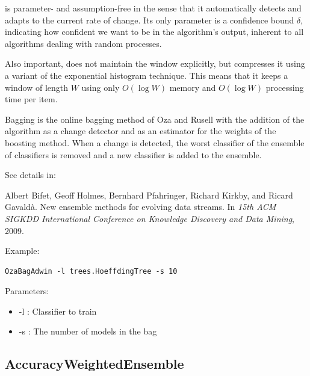 \documentclass[a4paper,12pt,twoside]{book}
\begin{document}

\adwin is parameter- and assumption-free in the sense that 
it automatically detects and adapts to the current rate of change. 
Its only parameter is a confidence bound $\delta$,
indicating how confident we want to be in the algorithm's output, 
inherent to all algorithms dealing with random processes. 

Also important, \adwin does not maintain the window
explicitly, but compresses it using a variant of the exponential histogram
technique. %
This means that it keeps a window of length $W$
using only $O(\log W)$ memory and $O(\log W)$ processing time per item. %

\adwin Bagging is the online bagging method of Oza and Rusell %
with the  addition of the \adwin algorithm as a change 
detector and as an estimator for the weights of the boosting method.
When a change is detected, the worst classifier of the ensemble of classifiers 
is removed and a new classifier is added to the ensemble.


See details in:

\begin{itemize}
Albert Bifet, Geoff Holmes, Bernhard Pfahringer, Richard Kirkby, and Ricard
  Gavald\`a.
\newblock New ensemble methods for evolving data streams.
\newblock In {\em 15th ACM SIGKDD International Conference on Knowledge
  Discovery and Data Mining}, 2009.
\end{itemize}



Example:
\begin{footnotesize}\begin{verbatim}
OzaBagAdwin -l trees.HoeffdingTree -s 10
\end{verbatim}\end{footnotesize}

Parameters:
\begin{itemize}
\item -l : Classifier to train
\item -s : The number of models in the bag
\end{itemize}


 
\subsection{AccuracyWeightedEnsemble}
\end{document}
